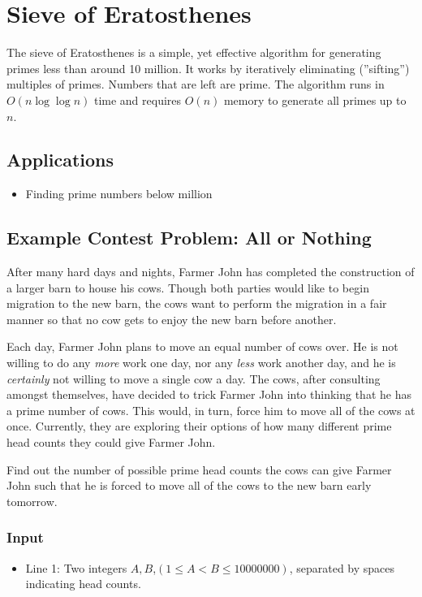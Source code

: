 \section{Sieve of Eratosthenes}
The sieve of Eratosthenes is a simple, yet effective algorithm for generating primes less than around 10 million.
It works by iteratively eliminating (''sifting'') multiples of primes.
Numbers that are left are prime.
The algorithm runs in $O(n\log\log n)$ time and requires $O(n)$ memory to generate all primes up to $n$.

\subsection{Applications}
\begin{itemize}
	\item	Finding prime numbers below  million
\end{itemize}

\subsection{Example Contest Problem: All or Nothing}
After many hard days and nights, Farmer John has completed the construction of a larger barn to house his cows.
Though both parties would like to begin migration to the new barn, the cows want to perform the migration in a fair manner so that no cow gets to enjoy the new barn before another.

Each day, Farmer John plans to move an equal number of cows over.
He is not willing to do any \textit{more} work one day, nor any \textit{less} work another day, and he is \textit{certainly} not willing to move a single cow a day.
The cows, after consulting amongst themselves, have decided to trick Farmer John into thinking that he has a prime number of cows.
This would, in turn, force him to move all of the cows at once.
Currently, they are exploring their options of how many different prime head counts they could give Farmer John.

Find out the number of possible prime head counts the cows can give Farmer John such that he is forced to move all of the cows to the new barn early tomorrow.

\subsubsection{Input}
\begin{itemize}
	\item Line 1: Two integers $A,B$,$(1 \leq A < B \leq 10000000)$, separated by spaces indicating head counts.
\end{itemize}

